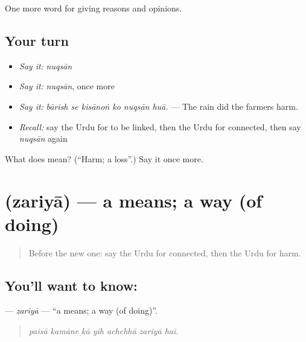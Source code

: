 \begin{grammarlens}[title={What you've built}]
One more word for giving reasons and opinions.
\end{grammarlens}

\subsection*{Your turn}
\begin{itemize}
\raggedright
  \item \emph{Say it:} \emph{nuqsān}
  \item \emph{Say it:} \emph{nuqsān}, once more
  \item \emph{Say it:} \emph{bārish se kisānoṅ ko nuqsān huā.} — The rain did the farmers harm.
  \item \emph{Recall:} say the Urdu for to be linked, then the Urdu for connected, then say \emph{nuqsān} again
\end{itemize}

\begin{tcolorbox}[breakable,colback=teal!4,colframe=teal!35!black,title={Before you move on}]
What does  mean? (\textquotedblleft{}Harm; a loss\textquotedblright{}.) Say it once more.
\end{tcolorbox}
\section[\texorpdfstring{\ur{ذریعہ} (zariyā)}{ذریعہ (zariyā)}]{ (zariyā) — a means; a way (of doing)}

\label{lesson:UR-C332-zariya}



\begin{quote}
Before the new one: say the Urdu for connected, then the Urdu for harm.
\end{quote}

\subsection*{You'll want to know: }
\textbf{} — \emph{zariyā} — \textquotedblleft{}a means; a way (of doing)\textquotedblright{}.

\begin{quote}
      
\end{quote}

\begin{quote}
\emph{paisā kamāne kā yih achchhā zariyā hai.}
\end{quote}

